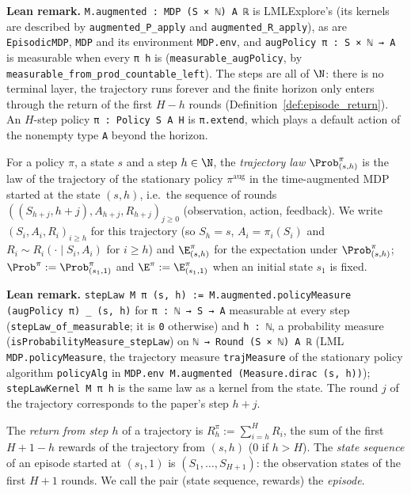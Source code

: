 \textbf{Lean remark.} \texttt{M.augmented : MDP (S × ℕ) A ℝ} is LMLExplore's (its kernels are
described by \texttt{augmented\_P\_apply} and \texttt{augmented\_R\_apply}), as are
\texttt{EpisodicMDP}, \texttt{MDP} and its environment \texttt{MDP.env}, and
\texttt{augPolicy π : S × ℕ → A} is measurable when every
\texttt{π h} is (\texttt{measurable\_augPolicy}, by
\texttt{measurable\_from\_prod\_countable\_left}). The steps are all of $\N$: there is no
terminal layer, the trajectory runs forever and the finite horizon only enters through the
return of the first $H - h$ rounds (Definition~\ref{def:episode_return}). An $H$-step policy
\texttt{π : Policy S A H} is \texttt{π.extend}, which plays a default action of the nonempty
type \texttt{A} beyond the horizon.

\begin{definition}\label{def:step_law}
\leanok
{}
For a policy $\pi$, a state $s$ and a step $h \in \N$, the \emph{trajectory law}
$\Prob^\pi_{(s, h)}$ is the law of the trajectory of the stationary policy $\pi^{\mathrm{aug}}$ in
the time-augmented MDP started at the state $(s, h)$, i.e.\ the sequence of rounds
$((S_{h+j}, h + j), A_{h+j}, R_{h+j})_{j \ge 0}$ (observation, action, feedback). We write
$(S_i, A_i, R_i)_{i \ge h}$ for this trajectory (so $S_h = s$, $A_i = \pi_i(S_i)$ and
$R_i \sim R_i(\cdot \mid S_i, A_i)$ for $i \ge h$) and $\E^\pi_{(s, h)}$ for the expectation under
$\Prob^\pi_{(s, h)}$; $\Prob^\pi := \Prob^\pi_{(s_1, 1)}$ and $\E^\pi := \E^\pi_{(s_1, 1)}$ when an
initial state $s_1$ is fixed.
\end{definition}

\textbf{Lean remark.} \texttt{stepLaw M π (s, h) := M.augmented.policyMeasure (augPolicy π) \_ (s, h)}
for \texttt{π : ℕ → S → A} measurable at every step (\texttt{stepLaw\_of\_measurable}; it is
\texttt{0} otherwise) and \texttt{h : ℕ}, a probability measure
(\texttt{isProbabilityMeasure\_stepLaw}) on
\texttt{ℕ → Round (S × ℕ) A ℝ} (LML \texttt{MDP.policyMeasure}, the trajectory measure
\texttt{trajMeasure} of the stationary policy algorithm \texttt{policyAlg} in
\texttt{MDP.env M.augmented (Measure.dirac (s, h))}); \texttt{stepLawKernel M π h} is the same
law as a kernel from the state. The round $j$ of the trajectory corresponds to the paper's step
$h + j$.

\begin{definition}\label{def:episode_return}
\leanok
{}
The \emph{return from step $h$} of a trajectory is $R^\pi_h := \sum_{i = h}^H R_i$, the sum of
the first $H + 1 - h$ rewards of the trajectory from $(s, h)$ ($0$ if $h > H$). The
\emph{state sequence} of an episode started at $(s_1, 1)$ is $(S_1, \dots, S_{H+1})$: the
observation states of the first $H + 1$ rounds. We call the pair (state sequence, rewards) the
\emph{episode}.
\end{definition}

